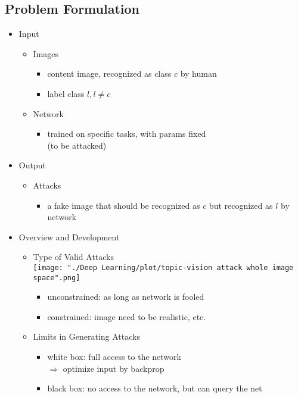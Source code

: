 \subsection{Problem Formulation}
\begin{itemize}
\item Input
	\begin{itemize}
	\item Images
		\begin{itemize}
		\item content image, recognized as class $c$ by human
		\item label class $l, l\neq c$
		\end{itemize}
	\item Network
		\begin{itemize}
		\item trained on specific tasks, with params fixed \\
		(to be attacked)
		\end{itemize}
	\end{itemize}
\item Output
	\begin{itemize}
	\item Attacks
		\begin{itemize}
		\item a fake image that should be recognized as $c$ but recognized as $l$ by network
		\end{itemize}
	\end{itemize}
\item Overview and Development
	\begin{itemize}
	\item Type of Valid Attacks \\
	\texttt{[image: "./Deep Learning/plot/topic-vision attack whole image space".png]}
		\begin{itemize}
		\item unconstrained: as long as network is fooled
		\item constrained: image need to be realistic, etc.
		\end{itemize}
	\item Limits in Generating Attacks
		\begin{itemize}
		\item white box: full access to the network \\
		$\Rightarrow$ optimize input by backprop
		\item black box: no access to the network, but can query the net \\

\end{itemize}
\end{itemize}
\end{itemize}
